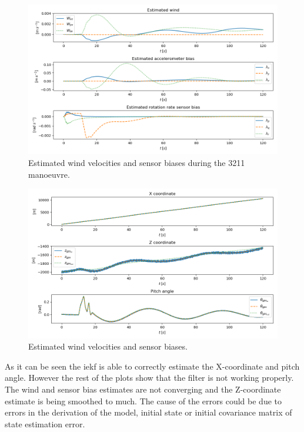 \begin{figure}
    \centering
    \includegraphics[width=14cm]{figures/iekf_wag}
    \caption{Estimated wind velocities and sensor biases during the 3211 manoeuvre.}
    \label{fig:iekf_wag}
\end{figure}

\begin{figure}
    \centering
    \includegraphics[width=14cm]{figures/iekf_xzphi}
    \caption{Estimated wind velocities and sensor biases.}
    \label{fig:iekf_xzphi}
\end{figure}

As it can be seen the \gls{iekf} is able to correctly estimate the X-coordinate and pitch angle. However the rest of the plots show that the filter is not working properly. The wind and sensor bias estimates are not converging and the Z-coordinate estimate is being smoothed to much. The cause of the errors could be due to errors in the derivation of the model, initial state or initial covariance matrix of state estimation error.


